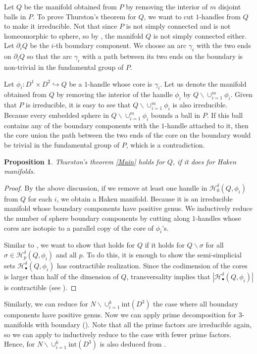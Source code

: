 \documentclass[a4paper]{amsart}
\newtheorem{prop}[thm]{Proposition}
\theoremstyle{definition}
\theoremstyle{remark}
\numberwithin{equation}{section}
\begin{document}
Let $Q$ be the manifold obtained from $P$ by removing the interior of $m$ disjoint balls in $P$. To prove Thurston's theorem for $Q$, we want to cut $1$-handles from $Q$ to make it irreducible. Not that since $P$ is not simply connected and is not homeomorphic to sphere, so by , the manifold $Q$ is not simply connected either. Let $\partial_iQ$ be the $i$-th boundary component. We choose  an arc $\gamma_i$ with the two ends on $\partial_iQ$ so that the arc $\gamma_i$ with a path between its two ends on the boundary is non-trivial in the fundamental group of $P$. 

Let $\phi_i: D^1\times D^2\hookrightarrow Q$ be a $1$-handle whose core is $\gamma_i$. Let us denote the manifold obtained from $Q$ by removing the interior of the handle $\phi_i$ by $Q\backslash \cup_{i=1}^m \phi_i$. Given that $P$ is irreducible, it is easy to see that   $Q\backslash \cup_{i=1}^m \phi_i$ is also irreducible. Because every embedded sphere in $Q\backslash \cup_{i=1}^m \phi_i$ bounds a ball in $P$. If this ball contains any of the boundary components with the $1$-handle attached to it, then the core union the path between the two ends of the core on the boundary would be trivial in the fundamental group of $P$, which is a contradiction.
\begin{prop}\label{irr}
Thurston's theorem \ref{Main} holds for $Q$, if it does for Haken manifolds.
\end{prop}
\begin{proof}
 By the above discussion, if we remove at least one handle in $\mathcal{H}^{\delta}_{0}(Q,\phi_i)$ from  $Q$ for each $i$, we obtain a Haken manifold. Because it is an irreducible manifold whose boundary components have positive genus. We inductively reduce the number of sphere boundary components by cutting along $1$-handles whose cores are isotopic to a parallel copy of the core of $\phi_i$'s. 
 
 Similar to , we want to  show that   holds for $Q$ if it holds for $Q\backslash \sigma$ for all $\sigma\in \mathcal{H}^{\delta}_{p}(Q,\phi_i)$ and all $p$. To do this, it is enough to show  the semi-simplicial sets $\mathcal{H}^{\delta}_{\bullet}(Q,\phi_i)$ has contractible realization. Since the codimension of the cores is larger than half of the dimension of $Q$, transversality implies that $|\mathcal{H}^{\delta}_{\bullet}(Q,\phi_i)|$  is contractible (see ).
\end{proof}
Similarly, we can reduce  for $N\backslash \cup_{i=1}^k \text{int}(D^3)$  the case where all boundary components have positive genus. Now we can apply prime decomposition for $3$-manifolds with boundary (\cite[Section 3]{MR2098385}). Note that all the prime factors are irreducible again, so we can apply  to inductively reduce to the case with fewer prime factors. Hence,  for $N\backslash \cup_{i=1}^k \text{int}(D^3)$ is also deduced from .
\end{document}
